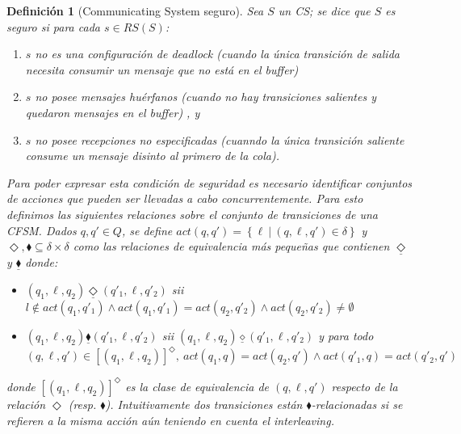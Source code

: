 \documentclass[paper=a4, fontsize=11pt, spanish]{scrartcl} %
\numberwithin{equation}{section} %
\numberwithin{figure}{section} %
\numberwithin{table}{section} %
\newtheorem{definition}{Definición}
\newcommand{\romboeqb}{\underline{\diamond}}
\begin{document}
\begin{definition}[Communicating System seguro] Sea $S$ un CS; se dice que $S$ es \emph{seguro} si para cada $s \in RS(S)$:
\begin{enumerate}
\item $s$ no es una configuración de deadlock (cuando la única transición de salida necesita consumir un mensaje que no está en el buffer)
\item $s$ no posee mensajes huérfanos (cuando no hay transiciones salientes y quedaron mensajes en el buffer) , y
\item $s$ no posee recepciones no especificadas (cuanndo la única transición saliente consume un mensaje disinto al primero de la cola).
\end{enumerate}
Para poder expresar esta condición de seguridad es necesario identificar conjuntos de acciones que pueden ser llevadas a cabo concurrentemente. Para esto definimos las siguientes relaciones sobre el conjunto de transiciones de una CFSM. Dados $q, q' \in Q$, se define $\mathit{act}(q,q') = \left\{\ell \ \left|\right. \ (q,\ell,q') \in \delta \right\}$ y $\Diamond, \blacklozenge \subseteq \delta \times \delta$ como las relaciones de equivalencia más pequeñas que contienen $\underline{\Diamond}$ y $\underline{\blacklozenge}$ donde:
\begin{itemize}
\item $(q_1, \ell, q_2) \underline{\Diamond} (q'_1, \ell, q'_2)$ sii $ l \notin \mathit{act}(q_1, q'_1) \land \mathit{act}(q_1, q'_1) = \mathit{act}(q_2, q'_2) \land \mathit{act}(q_2, q'_2) \neq \emptyset $
\item  $(q_1, \ell, q_2) \underline{\blacklozenge} (q'_1, \ell, q'_2)$ sii $ (q_1, \ell, q_2) \romboeqb (q'_1, \ell, q'_2) $ y para todo $(q,\ell,q') \in [(q_1, \ell, q_2) ]^{\Diamond}, \ \mathit{act}(q_1,q) = \mathit{act}(q_2,q') \land \mathit{act}(q'_1,q) = \mathit{act}(q'_2,q')$  
\end{itemize}
donde $[(q_1, \ell, q_2) ]^{\Diamond}$ es la clase de equivalencia de $(q, \ell, q')$ respecto de la relación $\Diamond$ (resp. $\blacklozenge$). Intuitivamente dos transiciones están $\blacklozenge$-relacionadas si se refieren a la misma acción aún teniendo en cuenta el interleaving.
\end{definition}
\end{document}
